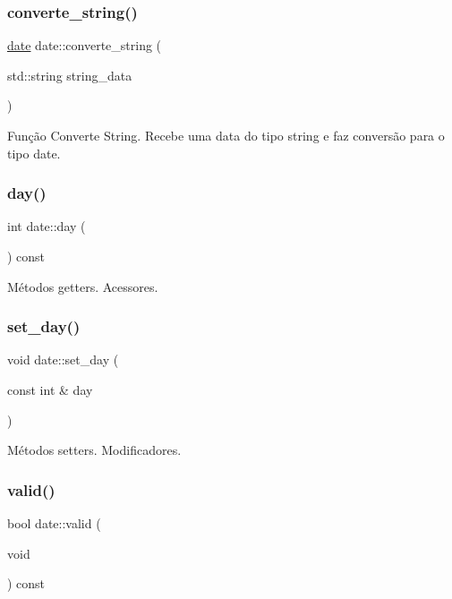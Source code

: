 \subsubsection{\texorpdfstring{converte\+\_\+string()}{converte\_string()}}
{\footnotesize\ttfamily \hyperlink{classdate}{date} date\+::converte\+\_\+string (\begin{DoxyParamCaption}\item[{std\+::string}]{string\+\_\+data }\end{DoxyParamCaption})}

Função Converte String. Recebe uma data do tipo string e faz conversão para o tipo date. \mbox{\label{classdate_a9c9bfe2a9f48360110b43b493695e42d}} 
\subsubsection{\texorpdfstring{day()}{day()}}
{\footnotesize\ttfamily int date\+::day (\begin{DoxyParamCaption}{ }\end{DoxyParamCaption}) const}

Métodos getters. Acessores. \mbox{\label{classdate_ac0a3fdbc68f887db60856aff3527ef43}} 
\subsubsection{\texorpdfstring{set\+\_\+day()}{set\_day()}}
{\footnotesize\ttfamily void date\+::set\+\_\+day (\begin{DoxyParamCaption}\item[{const int \&}]{day }\end{DoxyParamCaption})}

Métodos setters. Modificadores. \mbox{\label{classdate_a95b10c2203568baea43f9847ca354113}} 
\subsubsection{\texorpdfstring{valid()}{valid()}}
{\footnotesize\ttfamily bool date\+::valid (\begin{DoxyParamCaption}\item[{void}]{ }\end{DoxyParamCaption}) const}

